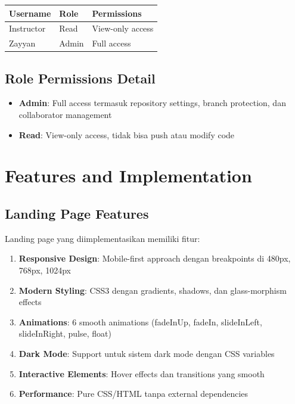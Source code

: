 \documentclass[a4paper,oneside,11pt]{book}
\begin{document}
\begin{center}
\begin{tabular}{|l|l|l|}
\hline
\textbf{Username} & \textbf{Role} & \textbf{Permissions} \\
\hline
Instructor & Read & View-only access \\
\hline
Zayyan & Admin & Full access \\
\hline
\end{tabular}
\end{center}

\subsection{Role Permissions Detail}

\begin{itemize}
    \item \textbf{Admin}: Full access termasuk repository settings, branch protection, dan collaborator management
    \item \textbf{Read}: View-only access, tidak bisa push atau modify code
\end{itemize}

\section{Features and Implementation}

\subsection{Landing Page Features}

Landing page yang diimplementasikan memiliki fitur:

\begin{enumerate}
    \item \textbf{Responsive Design}: Mobile-first approach dengan breakpoints di 480px, 768px, 1024px
    \item \textbf{Modern Styling}: CSS3 dengan gradients, shadows, dan glass-morphism effects
    \item \textbf{Animations}: 6 smooth animations (fadeInUp, fadeIn, slideInLeft, slideInRight, pulse, float)
    \item \textbf{Dark Mode}: Support untuk sistem dark mode dengan CSS variables
    \item \textbf{Interactive Elements}: Hover effects dan transitions yang smooth
    \item \textbf{Performance}: Pure CSS/HTML tanpa external dependencies
\end{enumerate}
\end{document}
